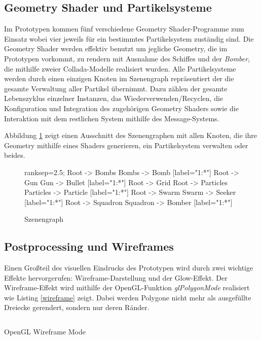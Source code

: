 \documentclass[a4paper]{article}
\begin{document}
\subsection{Geometry Shader und Partikelsysteme}
Im Prototypen kommen fünf verschiedene Geometry Shader-Programme zum Einsatz wobei vier jeweils für ein bestimmtes Partikelsystem zuständig sind. Die Geometry Shader werden effektiv benutzt um jegliche Geometry, die im Prototypen vorkommt, zu rendern mit Ausnahme des Schiffes und der \textit{Bomber}, die mithilfe zweier Collada-Modelle realisiert wurden. Alle Partikelsysteme werden durch einen einzigen Knoten im Szenengraph repräsentiert der die gesamte Verwaltung aller Partikel übernimmt. Dazu zählen der gesamte Lebenszyklus einzelner Instanzen, das Wiederverwenden/Recyclen, die Konfiguration und Integration des zugehörigen Geometry Shaders sowie die Interaktion mit dem restlichen System mithilfe des Message-Systems.

Abbildung \ref{scenegraph} zeigt einen Ausschnitt des Szenengraphen mit allen Knoten, die ihre Geometry mithilfe eines Shaders generieren, ein Partikelsystem verwalten oder beides.

\begin{figure}[H]
\centering
{} {
    ranksep=2.5;
    Root -> Bombs
    Bombs -> Bomb [label="1:*"]
    Root -> Gun
    Gun -> Bullet [label="1:*"]
    Root -> Grid
    Root -> Particles
    Particles -> Particle [label="1:*"]
    Root -> Swarm
    Swarm -> Seeker [label="1:*"]
    Root -> Squadron
    Squadron -> Bomber [label="1:*"]
}
\caption{Szenengraph}
\label{scenegraph}
\end{figure}

\subsection{Postprocessing und Wireframes}
Einen Großteil des visuellen Eindrucks des Prototypen wird durch zwei wichtige Effekte hervorgerufen: Wireframe-Darstellung und der Glow-Effekt. Der Wireframe-Effekt wird mithilfe der OpenGL-Funktion \textit{glPolygonMode} realisiert wie Listing \ref{wireframe} zeigt. Dabei werden Polygone nicht mehr als ausgefüllte Dreiecke gerendert, sondern nur deren Ränder.

\begin{listing}[H]
\inputminted[firstline=10, lastline=10]{scala}{../scala/org/whiskeysierra/powpow/EnableWireframe.scala}
\caption{OpenGL Wireframe Mode}
\label{wireframe}
\end{listing}
\end{document}
